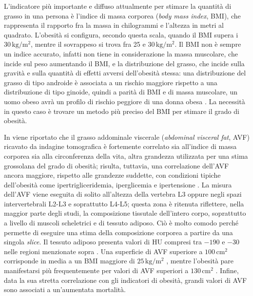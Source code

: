 L’indicatore più importante e diffuso attualmente per stimare la quantità di grasso in una persona è l’indice di massa corporea (\textit{body mass index}, BMI), che rappresenta il rapporto fra la massa in chilogrammi e l'altezza in metri al quadrato. L’obesità si configura, secondo questa scala, quando il BMI supera i $30\,\mathrm{kg}/\mathrm{m}^2$, mentre il sovrappeso si trova fra 25 e $30\,\mathrm{kg}/\mathrm{m}^2$. Il BMI non è sempre un indice accurato, infatti non tiene in considerazione la massa muscolare, che incide sul peso aumentando il BMI, e la distribuzione del grasso, che incide sulla gravità e sulla quantità di effetti avversi dell'obesità stessa: una distribuzione del grasso di tipo androide è associata a un rischio maggiore rispetto a una distribuzione di tipo ginoide, quindi a parità di BMI e di massa muscolare, un uomo obeso avrà un profilo di rischio peggiore di una donna obesa \cite{Murray2017}. La necessità in questo caso è trovare un metodo più preciso del BMI per stimare il grado di obesità.

In \cite{Murray2017} viene riportato che il grasso addominale viscerale (\textit{abdominal visceral fat}, AVF) ricavato da indagine tomografica è fortemente correlato sia all'indice di massa corporea sia alla circonferenza della vita, altra grandezza utilizzata per una stima grossolana del grado di obesità; risulta, tuttavia, una correlazione dell'AVF ancora maggiore, rispetto alle grandezze suddette, con condizioni tipiche dell'obesità come ipertrigliceridemia, iperglicemia e ipertensione \cite{Oka2008, Murray2017}. La misura dell'AVF viene eseguita di solito all'altezza della vertebra L3 oppure negli spazi intervertebrali L2-L3 e soprattutto L4-L5; questa zona è ritenuta riflettere, nella maggior parte degli studi, la composizione tissutale dell'intero corpo, soprattutto a livello di muscoli scheletrici e di tessuto adiposo. Ciò è molto comodo perché permette di eseguire una stima della composizione corporea a partire da una singola \textit{slice}. Il tessuto adiposo presenta valori di HU compresi tra $-190$ e $-30$ nelle regioni menzionate sopra \cite{Rankinen1999, Murray2017}. Una superficie di AVF superiore a $100\,\mathrm{cm}^2$ corrisponde in media a un BMI maggiore di $25\,\mathrm{kg}/\mathrm{m}^2$ \cite{Miyatake2004, Murray2017}, mentre l’obesità pare manifestarsi più frequentemente per valori di AVF superiori a $130\,\mathrm{cm}^2$ \cite{Rankinen1999, Murray2017}. Infine, data la sua stretta correlazione con gli indicatori di obesità, grandi valori di AVF sono associati a un'aumentata mortalità.

